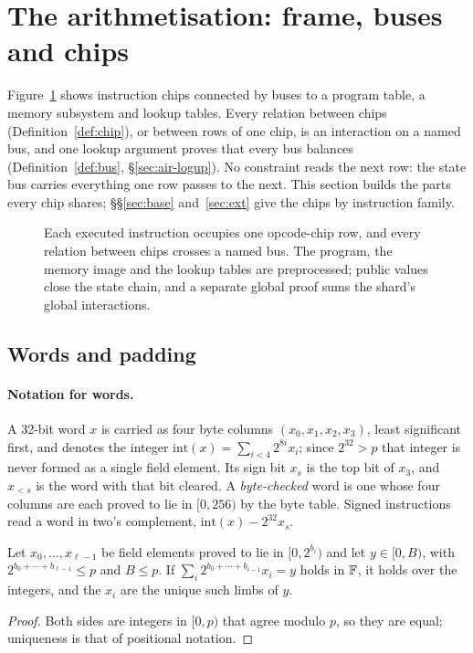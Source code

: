 \section{The arithmetisation: frame, buses and chips}
\label{sec:air}

Figure~\ref{fig:processor} shows instruction chips connected by buses to a program table, a memory subsystem and lookup tables. Every relation between chips (Definition~\ref{def:chip}), or between rows of one chip, is an interaction on a named bus, and one lookup argument proves that every bus balances (Definition~\ref{def:bus}, \S\ref{sec:air-logup}). No constraint reads the next row: the state bus carries everything one row passes to the next. This section builds the parts every chip shares; \S\S\ref{sec:base} and~\ref{sec:ext} give the chips by instruction family.

\begin{figure}[t]
\centering
\resizebox{\textwidth}{!}{}
\caption{Each executed instruction occupies one opcode-chip row, and every relation between chips crosses a named bus. The program, the memory image and the lookup tables are preprocessed; public values close the state chain, and a separate global proof sums the shard's global interactions.}
\label{fig:processor}
\end{figure}

\subsection{Words and padding}
\label{sec:air-chips}

\paragraph{Notation for words.} A 32-bit word $x$ is carried as four byte columns $(x_0, x_1, x_2, x_3)$, least significant first, and denotes the integer $\mathrm{int}(x) = \sum_{i<4} 2^{8i} x_i$; since $2^{32} > p$ that integer is never formed as a single field element. Its sign bit $x_s$ is the top bit of $x_3$, and $x_{<s}$ is the word with that bit cleared. A \emph{byte-checked} word is one whose four columns are each proved to lie in $[0, 256)$ by the byte table. Signed instructions read a word in two's complement, $\mathrm{int}(x) - 2^{32} x_s$.

\begin{lemma}
\label{lem:limbs}
Let $x_0, \ldots, x_{\ell-1}$ be field elements proved to lie in $[0, 2^{b_i})$ and let $y \in [0, B)$, with $2^{b_0 + \cdots + b_{\ell-1}} \le p$ and $B \le p$. If $\sum_i 2^{b_0 + \cdots + b_{i-1}} x_i = y$ holds in $\mathbb{F}$, it holds over the integers, and the $x_i$ are the unique such limbs of $y$.
\end{lemma}
\begin{proof}
Both sides are integers in $[0, p)$ that agree modulo $p$, so they are equal; uniqueness is that of positional notation.
\end{proof}

